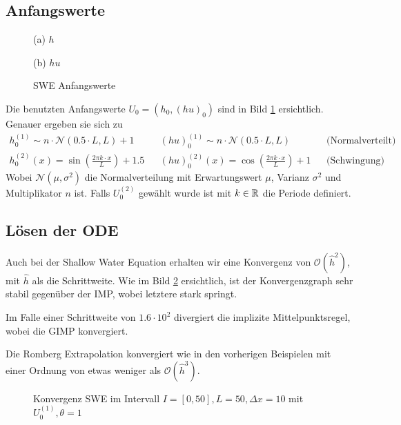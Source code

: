 \subsection{Anfangswerte}
\begin{figure}[H]
\footnotesize
\centering
\begin{minipage}[b]{0.49\linewidth}

\caption*{(a) $h$}
\end{minipage}
\begin{minipage}[b]{0.49\linewidth}

\caption*{(b) $hu$}
\end{minipage}
\caption{SWE Anfangswerte}
\label{fig:sweInitialValues}
\end{figure}
Die benutzten Anfangswerte $U_0 = (h_0,(hu)_0)$ sind in Bild \ref{fig:sweInitialValues} ersichtlich. Genauer ergeben sie sich zu
\[
\begin{aligned}
 h_0^{(1)} \sim n\cdot\mathcal N(0.5\cdot L,L) + 1 &&(hu)_0^{(1)}\sim n\cdot\mathcal N(0.5\cdot L,L) && \text{(Normalverteilt)}\\
 h_0^{(2)}(x)= \sin\left( \frac{2\pi k\cdot x}{L}\right) + 1.5 &&(hu)_0^{(2)}(x) = \cos\left( \frac{2\pi k\cdot x}{L}\right) + 1  && \text{(Schwingung)}
\end{aligned}
\]
Wobei $\mathcal N(\mu, \sigma^2)$ die Normalverteilung mit Erwartungswert $\mu$, Varianz $\sigma^2$ und Multiplikator $n$ ist. Falls $U_0^{(2)}$ gewählt wurde ist mit $k\in \mathbb{R}$ die Periode definiert. 
\subsection{Lösen der ODE}
Auch bei der Shallow Water Equation erhalten wir eine Konvergenz von $\mathcal O(\hat h^2)$, mit $\hat h$ als die Schrittweite. Wie im Bild \ref{fig:sweConvergence} ersichtlich, ist der Konvergenzgraph sehr stabil gegenüber der IMP, wobei letztere stark springt.

Im Falle einer Schrittweite von $1.6\cdot 10^2$ divergiert die implizite Mittelpunktsregel, wobei die GIMP konvergiert. 

Die Romberg Extrapolation konvergiert wie in den vorherigen Beispielen mit einer Ordnung von etwas weniger als $\mathcal O(\hat h^3)$. 

\begin{figure}
\centering

\caption{Konvergenz SWE im Intervall $I = [0,50], L=50, \Delta x=10$ mit $U_0^{(1)},\theta=1$}
\label{fig:sweConvergence}
\end{figure}


